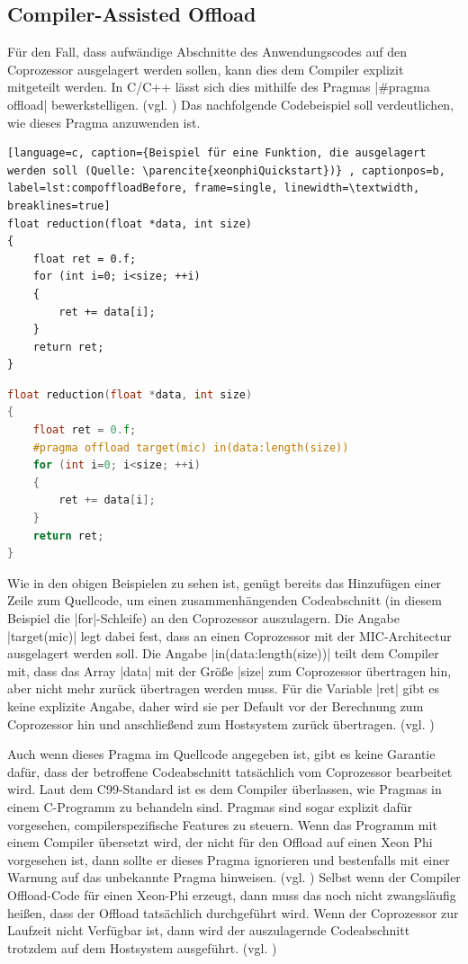 \documentclass[../main.tex]{subfiles}
\begin{document}
\subsection{Compiler-Assisted Offload} \label{phiCompAssistOffload}
Für den Fall, dass aufwändige Abschnitte des Anwendungscodes auf den Coprozessor ausgelagert werden sollen, kann dies dem Compiler explizit mitgeteilt werden. In C/C++ lässt sich dies mithilfe des Pragmas |#pragma offload| bewerkstelligen. (vgl. \cite{xeonphiQuickstart}) Das nachfolgende Codebeispiel soll verdeutlichen, wie dieses Pragma anzuwenden ist. 
\begin{lstlisting}[language=c, caption={Beispiel für eine Funktion, die ausgelagert werden soll (Quelle: \parencite{xeonphiQuickstart})} , captionpos=b, label=lst:compoffloadBefore, frame=single, linewidth=\textwidth, breaklines=true]
float reduction(float *data, int size) 
{ 
	float ret = 0.f; 
	for (int i=0; i<size; ++i) 
	{
		ret += data[i]; 
	} 
	return ret; 
}
\end{lstlisting}
\begin{lstlisting}[language=c, caption={Beispielfunktion mit pragma zur Auslagerung(Quelle: \parencite{xeonphiQuickstart})}, captionpos=b, label=lst:compoffloadAfter, frame=single, linewidth=\textwidth, breaklines=true]
float reduction(float *data, int size) 
{ 
	float ret = 0.f; 
	#pragma offload target(mic) in(data:length(size))
	for (int i=0; i<size; ++i) 
	{
		ret += data[i]; 
	} 
	return ret; 
}
\end{lstlisting}
Wie in den obigen Beispielen zu sehen ist, genügt bereits das Hinzufügen einer Zeile zum Quellcode, um einen zusammenhängenden Codeabschnitt (in diesem Beispiel die |for|-Schleife) an den Coprozessor auszulagern. Die Angabe |target(mic)| legt dabei fest, dass an einen Coprozessor mit der MIC-Architectur ausgelagert werden soll. Die Angabe |in(data:length(size))| teilt dem Compiler mit, dass das Array |data| mit der Größe |size| zum Coprozessor übertragen hin, aber nicht mehr zurück übertragen werden muss. Für die Variable |ret| gibt es keine explizite Angabe, daher wird sie per Default vor der Berechnung zum Coprozessor hin und anschließend zum Hostsystem zurück übertragen. (vgl. \cite{xeonphiQuickstart})

Auch wenn dieses Pragma im Quellcode angegeben ist, gibt es keine Garantie dafür, dass der betroffene Codeabschnitt tatsächlich vom Coprozessor bearbeitet wird. Laut dem C99-Standard ist es dem Compiler überlassen, wie Pragmas in einem C-Programm zu behandeln sind. Pragmas sind sogar explizit dafür vorgesehen, compilerspezifische Features zu steuern. Wenn das Programm mit einem Compiler übersetzt wird, der nicht für den Offload auf einen Xeon Phi vorgesehen ist, dann sollte er dieses Pragma ignorieren und bestenfalls mit einer Warnung auf das unbekannte Pragma hinweisen. (vgl. \cite{gccDokuPragmas}) Selbst wenn der Compiler Offload-Code für einen Xeon-Phi erzeugt, dann muss das noch nicht zwangsläufig heißen, dass der Offload tatsächlich durchgeführt wird. Wenn der Coprozessor zur Laufzeit nicht Verfügbar ist, dann wird der auszulagernde Codeabschnitt trotzdem auf dem Hostsystem ausgeführt. (vgl. \cite{xeonphiQuickstart})
\end{document}
